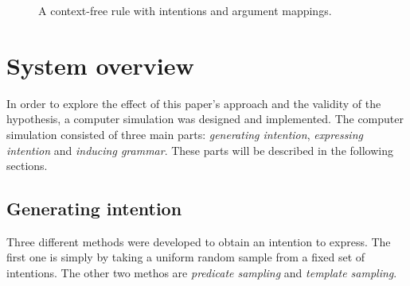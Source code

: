 \documentclass[a4paper]{article}
\begin{document}
\begin{figure}[h!]
\centering
{}
\caption{A context-free rule with intentions and argument mappings.}
\label{fig:rule}
\end{figure}

\section{System overview}
\label{sec:system_overview}
In order to explore the effect of this paper's approach and the validity of the hypothesis, a computer simulation was designed and implemented. The computer simulation consisted of three main parts: \emph{generating intention}, \emph{expressing intention} and \emph{inducing grammar}. These parts will be described in the following sections.
\subsection{Generating intention}
\label{ssec:Generating intention}
Three different methods were developed to obtain an intention to express. The first one is simply by taking a uniform random sample from a fixed set of intentions. The other two methos are \emph{predicate sampling} and \emph{template sampling}.
\end{document}
